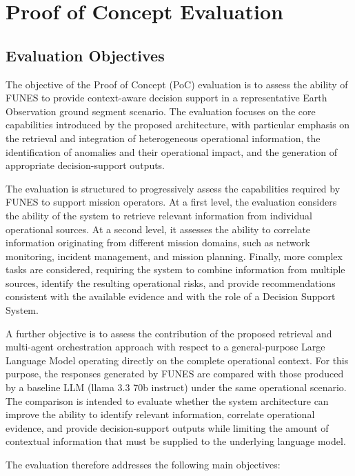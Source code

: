\chapter{Proof of Concept Evaluation}
\label{sec:poc evaluation}

\section{Evaluation Objectives}
\label{sec:evaluation objectives}

The objective of the Proof of Concept (PoC) evaluation is to assess the ability of FUNES to provide context-aware decision support in a representative Earth Observation ground segment scenario. The evaluation focuses on the core capabilities introduced by the proposed architecture, with particular emphasis on the retrieval and integration of heterogeneous operational information, the identification of anomalies and their operational impact, and the generation of appropriate decision-support outputs.

The evaluation is structured to progressively assess the capabilities required by FUNES to support mission operators. At a first level, the evaluation considers the ability of the system to retrieve relevant information from individual operational sources. At a second level, it assesses the ability to correlate information originating from different mission domains, such as network monitoring, incident management, and mission planning. Finally, more complex tasks are considered, requiring the system to combine information from multiple sources, identify the resulting operational risks, and provide recommendations consistent with the available evidence and with the role of a Decision Support System.

A further objective is to assess the contribution of the proposed retrieval and multi-agent orchestration approach with respect to a general-purpose Large Language Model operating directly on the complete operational context. For this purpose, the responses generated by FUNES are compared with those produced by a baseline LLM (llama 3.3 70b instruct) under the same operational scenario. The comparison is intended to evaluate whether the system architecture can improve the ability to identify relevant information, correlate operational evidence, and provide decision-support outputs while limiting the amount of contextual information that must be supplied to the underlying language model.

The evaluation therefore addresses the following main objectives:

